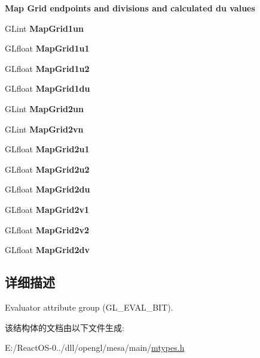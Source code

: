 \begin{Indent}\textbf{ Map Grid endpoints and divisions and calculated du values}\par
\begin{DoxyCompactItemize}
\item 
\mbox{\label{structgl__eval__attrib_ac6e8bc85de03b7c87b3109b3345741bd}} 
G\+Lint {\bfseries Map\+Grid1un}
\item 
\mbox{\label{structgl__eval__attrib_ad641afaef5170276d8c976434eef5189}} 
G\+Lfloat {\bfseries Map\+Grid1u1}
\item 
\mbox{\label{structgl__eval__attrib_ae57d0407917508ca097a9b49a2d73e9c}} 
G\+Lfloat {\bfseries Map\+Grid1u2}
\item 
\mbox{\label{structgl__eval__attrib_a7e33ae414b447895eb280c45f3db2cb0}} 
G\+Lfloat {\bfseries Map\+Grid1du}
\item 
\mbox{\label{structgl__eval__attrib_ae3e18c63816a4e24148c2346ee655bdb}} 
G\+Lint {\bfseries Map\+Grid2un}
\item 
\mbox{\label{structgl__eval__attrib_a913023c9d068f3c680ee96d71d01407b}} 
G\+Lint {\bfseries Map\+Grid2vn}
\item 
\mbox{\label{structgl__eval__attrib_a6395ee320a260adcad89254e28d1774f}} 
G\+Lfloat {\bfseries Map\+Grid2u1}
\item 
\mbox{\label{structgl__eval__attrib_a9533357da56d6e803776b14975f5c0f9}} 
G\+Lfloat {\bfseries Map\+Grid2u2}
\item 
\mbox{\label{structgl__eval__attrib_abc23f209b70b608c468d90c788fa6299}} 
G\+Lfloat {\bfseries Map\+Grid2du}
\item 
\mbox{\label{structgl__eval__attrib_a538245f3ef25786f608c0df0ef3bde3c}} 
G\+Lfloat {\bfseries Map\+Grid2v1}
\item 
\mbox{\label{structgl__eval__attrib_a5c45d9836ff6e29fb71a0b39bd12c969}} 
G\+Lfloat {\bfseries Map\+Grid2v2}
\item 
\mbox{\label{structgl__eval__attrib_a02bf2a435706ca570b741c6aa54d9619}} 
G\+Lfloat {\bfseries Map\+Grid2dv}
\end{DoxyCompactItemize}
\end{Indent}


\subsection{详细描述}
Evaluator attribute group (G\+L\+\_\+\+E\+V\+A\+L\+\_\+\+B\+IT). 

该结构体的文档由以下文件生成\+:\begin{DoxyCompactItemize}
\item 
E\+:/\+React\+O\+S-\/0../dll/opengl/mesa/main/\hyperlink{mtypes_8h}{mtypes.\+h}\end{DoxyCompactItemize}
